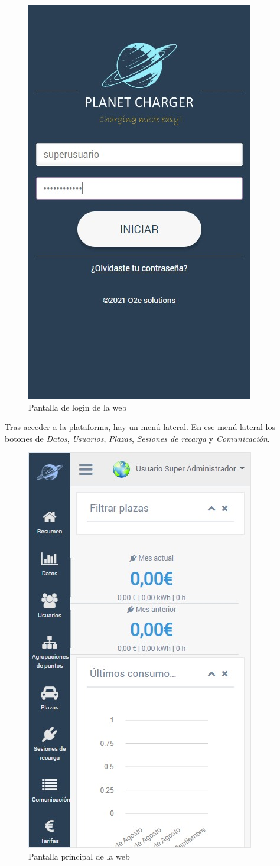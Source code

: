 \documentclass[12pt,a4paper,onecolumn,oneside]{report}
\begin{document}
\begin{figure}[H] 
\centering
  \includegraphics[width=.5\textwidth]{figuras/design1.png}
  \caption[Pantalla de login de la web]{Pantalla de login de la web\\
  }
  \label{fig:design1}
\end{figure}

Tras acceder a la plataforma, hay un menú lateral. En ese menú lateral los botones de \textit{Datos}, \textit{Usuarios}, \textit{Plazas}, \textit{Sesiones de recarga} y \textit{Comunicación}.

\begin{figure}[H] 
\centering
  \includegraphics[width=.5\textwidth]{figuras/design2.png}
  \caption[Pantalla principal de la web]{Pantalla principal de la web\\
  }
  \label{fig:design2}
\end{figure}
\end{document}

